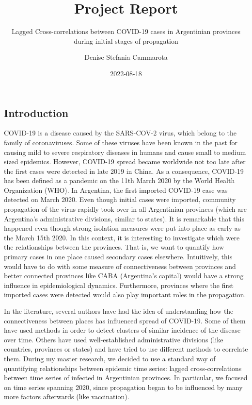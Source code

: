 \documentclass[
]{article}
\title{Project Report}
\subtitle{Lagged Cross-correlations between COVID-19 cases in
Argentinian provinces during initial stages of propagation}
\author{Denise Stefania Cammarota}
\date{2022-08-18}
\begin{document}
\maketitle

\hypertarget{introduction}{%
\subsection{Introduction}\label{introduction}}

COVID-19 is a disease caused by the SARS-COV-2 virus, which belong to
the family of coronaviruses. Some of these viruses have been known in
the past for causing mild to severe respiratory diseases in humans and
cause small to medium sized epidemics. However, COVID-19 spread became
worldwide not too late after the first cases were detected in late 2019
in China. As a consequence, COVID-19 has been defined as a pandemic on
the 11th March 2020 by the World Health Organization (WHO). In
Argentina, the first imported COVID-19 case was detected on March 2020.
Even though initial cases were imported, community propagation of the
virus rapidly took over in all Argentinian provinces (which are
Argentina's administrative divisions, similar to states). It is
remarkable that this happened even though strong isolation measures were
put into place as early as the March 15th 2020. In this context, it is
interesting to investigate which were the relationships between the
provinces. That is, we want to quantify how primary cases in one place
caused secondary cases elsewhere. Intuitively, this would have to do
with some measure of connectiveness between provinces and better
connected provinces like CABA (Argentina's capital) would have a strong
influence in epidemiological dynamics. Furthermore, provinces where the
first imported cases were detected would also play important roles in
the propagation.

In the literature, several authors have had the idea of understanding
how the connectiveness between places has influenced spread of COVID-19.
Some of them have used methods in order to detect clusters of similar
incidence of the disease over time. Others have used well-established
administrative divisions (like countries, provinces or states) and have
tried to use different methods to correlate them. During my master
research, we decided to use a standard way of quantifying relationships
between epidemic time series: lagged cross-correlations between time
series of infected in Argentinian provinces. In particular, we focused
on time series spanning 2020, since propagation began to be influenced
by many more factors afterwards (like vaccination).
\end{document}
